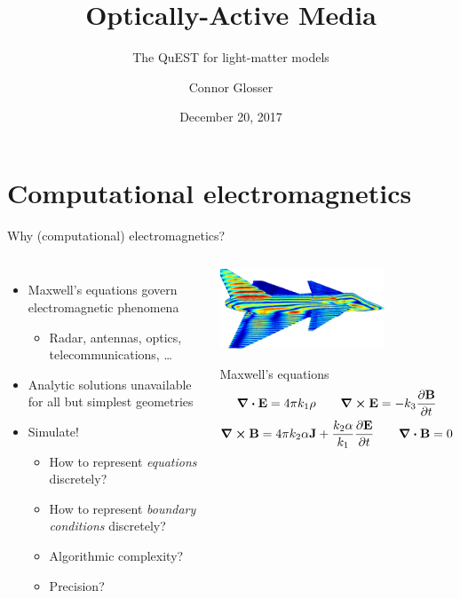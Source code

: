\documentclass[aspectratio=169, usenames, dvipsnames]{beamer}
\title{Optically-Active Media}
\subtitle{The QuEST for light-matter models}
\date{December 20, 2017}
\author{Connor Glosser}
\institute{Michigan State University, Physics \& Electrical Engineering}
\begin{document}
\maketitle

\section{Computational electromagnetics}

\begin{frame}{Why (computational) electromagnetics?}
  \begin{columns}
      \begin{itemize}
        \item Maxwell's equations govern electromagnetic phenomena
          \begin{itemize}
            \item Radar, antennas, optics, telecommunications, \ldots
          \end{itemize}
        \item Analytic solutions unavailable for all but simplest geometries
        \item Simulate!
          \begin{itemize}
            \item How to represent \emph{equations} discretely?
            \item How to represent \emph{boundary conditions} discretely?
            \item Algorithmic complexity?
            \item Precision?
          \end{itemize}
      \end{itemize}
    \begin{center}
      \includegraphics[width=0.7\textwidth]{figures/aircraft}
      \vspace{0.3cm}
      \begin{block}{Maxwell's equations}
        \begin{gather*}
          \div \vb{E} = 4 \pi k_1 \rho \qquad \curl \vb{E} = -k_3 \pdv{\vb{B}}{t} \\
          \curl \vb{B} = 4 \pi k_2 \alpha \vb{J} + \frac{k_2 \alpha}{k_1} \pdv{\vb{E}}{t} \qquad \div \vb{B} = 0
        \end{gather*}
      \end{block}
    \end{center}
  \end{columns}
\end{frame}
\end{document}
